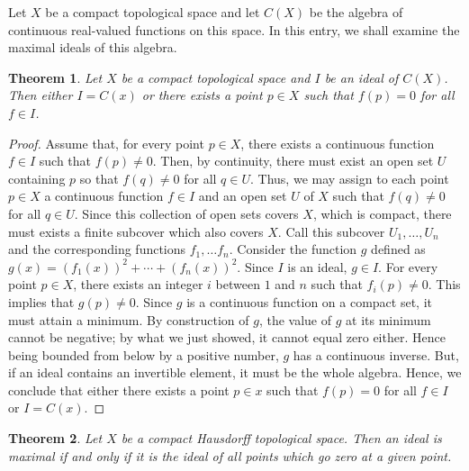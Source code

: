 \documentclass[12pt]{article}
\newtheorem{thm}{Theorem}
\begin{document}
Let $X$ be a compact topological space and let $C(X)$ be the algebra of continuous
real-valued functions on this space.  In this entry, we shall examine the maximal
ideals of this algebra.

\begin{thm}  Let $X$ be a compact topological space and $I$ be an ideal of $C(X)$.
Then either $I = C(x)$ or there exists a point $p \in X$ such that $f(p) = 0$ for
all $f \in I$.
\end{thm}

\begin{proof}
Assume that, for every point $p \in X$, there exists a continuous function $f \in I$ 
such that $f(p) \not= 0$.  Then, by continuity, there must exist an
open set $U$ containing $p$ so that $f(q) \not= 0$ for all $q \in U$.  Thus, we may
assign to each point $p \in X$ a continuous function $f \in I$ and
an open set $U$ of $X$ such that $f(q) \neq 0$ for all $q \in U$.  Since this 
collection of open sets covers $X$, which is compact, there must exists a finite
subcover which also covers $X$.  Call this subcover $U_1, \ldots, U_n$ and the
corresponding functions $f_1, \ldots f_n$.  Consider the function $g$ defined as
$g(x) = (f_1(x))^2 + \cdots + (f_n(x))^2$.  Since $I$ is an ideal, $g \in I$.  For every
point $p \in X$, there exists an integer $i$ between $1$ and $n$ such that $f_i (p) 
\not= 0$.  This implies that $g(p) \neq 0$.  Since $g$ is a continuous function on
a compact set, it must attain a minimum.  By construction of $g$, the value of $g$
at its minimum cannot be negative; by what we just showed, it cannot equal zero either.
Hence being bounded from below by a positive number, $g$ has a continuous inverse.  
But, if an ideal contains an invertible element, it must be the whole algebra.  Hence,
we conclude that either there exists a point $p \in x$ such that $f(p) = 0$ for all 
$f \in I$ or $I = C(x)$.
\end{proof}

\begin{thm}
Let $X$ be a compact Hausdorff topological space.  Then an ideal is maximal if
and only if it is the ideal of all points which go zero at a given point.
\end{thm}
\end{document}
